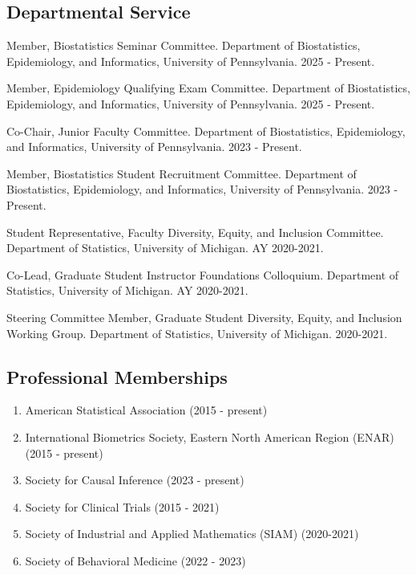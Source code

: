 \documentclass[letterpaper,11pt]{article} %
\begin{document}
	\subsection*{Departmental Service}
        \begin{etaremune}
            \item Member, Biostatistics Seminar Committee. Department of Biostatistics, Epidemiology, and Informatics, University of Pennsylvania. 2025 - Present.
            \item Member, Epidemiology Qualifying Exam Committee. Department of Biostatistics, Epidemiology, and Informatics, University of Pennsylvania. 2025 - Present.
            \item Co-Chair, Junior Faculty Committee. Department of Biostatistics, Epidemiology, and Informatics, University of Pennsylvania. 2023 - Present.
            \item Member, Biostatistics Student Recruitment Committee. Department of Biostatistics, Epidemiology, and Informatics, University of Pennsylvania. 2023 - Present.
            \item Student Representative, Faculty Diversity, Equity, and Inclusion Committee. Department of Statistics, University of Michigan. AY 2020-2021.
    	    \item Co-Lead, Graduate Student Instructor Foundations Colloquium. Department of Statistics, University of Michigan. AY 2020-2021.
    	    \item Steering Committee Member, Graduate Student Diversity, Equity, and Inclusion Working Group. Department of Statistics, University of Michigan. 2020-2021.
	\end{etaremune}

	\subsection*{Professional Memberships}
	\begin{enumerate}[noitemsep, leftmargin = 1.25em]
		\item[] American Statistical Association (2015 - present)
		\item[] International Biometrics Society, Eastern North American Region (ENAR) (2015 - present)
        \item[] Society for Causal Inference (2023 - present)
		\item[] Society for Clinical Trials (2015 - 2021)
		\item[] Society of Industrial and Applied Mathematics (SIAM) (2020-2021)
		\item[] Society of Behavioral Medicine (2022 - 2023)
	\end{enumerate}
\end{document}
